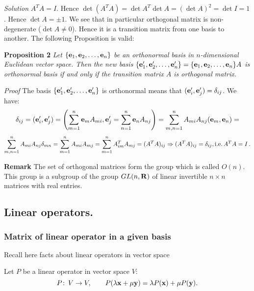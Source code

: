 \documentclass[12pt]{article}
\numberwithin{equation}{section}
\begin{document}
 {\sl Solution}  $A^TA=I$. Hence $\det (A^TA)=\det A^T\det A=(\det A)^2=\det I=1$. Hence $\det A=\pm 1$.
   We see that in particular orthogonal matrix is non-degenerate ($\det A\not=0$). Hence it is a transition matrix from one basis to another.      The following  Proposition is valid:

{\bf Proposition 2}  {\it Let $\{{\bf e}_1,{\bf e}_2,\dots,{\bf e}_n\}$ be  an 
orthonormal basis in $n$-dimensional Euclidean
vector space.  Then the new basis  $\{{\bf e}'_1,{\bf e}'_2,\dots,{\bf e}'_n\}=
\{{\bf e}_1,{\bf e}_2,\dots,{\bf e}_n\}A$ is orthonormal basis if and only if 
the transition matrix $A$ is orthogonal matrix.
}


{\footnotesize
{\sl Proof}
  The basis   $\{{\bf e}'_1,{\bf e}'_2,\dots,{\bf e}'_n\}$ is orthonormal  
means that $({\bf e}'_i,{\bf e}'_j)=\delta_{ij}$. We have:
                        $$
\delta_{ij}=({\bf e}'_i,{\bf e}'_j)=\left(\sum_{m=1}^n {\bf e}_m A_{mi},{\bf e}'_j=\sum_{n=1}^n {\bf e}_n A_{nj}\right)=
        \sum_{m,n=1}^n A_{mi}A_{nj}({\bf e}_m,{\bf e}_n)=
                        $$
                        \begin{equation}\label{orthogonmatr1}
\sum_{m,n=1}^n A_{mi}A_{nj}\delta_{mn}=\sum_{m=1}^n A_{mi}A_{mj}=
\sum_{m=1}^n A^T_{im}A_{mj}=(A^TA)_{ij}
\Rightarrow
 (A^TA)_{ij}=\delta_{ij}, {\rm i.e.\,} 
A^TA=I\,. 
\end{equation}
}

{\bf Remark}   The set of orthogonal matrices form the group
which is called $O(n)$. This group is a subgroup  of the group
   $GL(n,{\bf R})$  of linear invertible $n\times n$ matrices with
real entries.


\subsection {Linear operators.}

\subsubsection {Matrix of linear operator in a given basis}

Recall here facts about linear operators in vector space

Let $P$ be a linear operator in vector space $V$:
              \begin{equation*}
 P\colon \, V\to V,\qquad P(\lambda {\bf x}+\mu {\bf y})=\lambda P({\bf x})+\mu P({\bf y}).
              \end{equation*}
\end{document}
